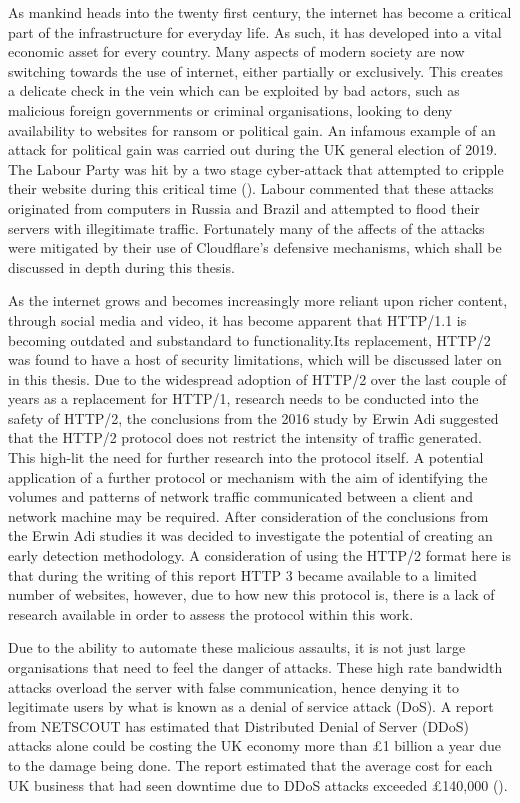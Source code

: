 
As mankind heads into the twenty first century, the internet has become a critical part of the infrastructure for everyday life. As such, it has developed into a vital economic asset for every country. Many aspects of modern society are now switching towards the use of internet, either partially or exclusively. This creates a delicate check in the vein which can be exploited by bad actors, such as malicious foreign governments or criminal organisations, looking to deny availability to websites for ransom or political gain. An infamous example of an attack for political gain was carried out during the UK general election of 2019. The Labour Party was hit by a two stage cyber-attack that attempted to cripple their website during this critical time (\cite{Labour}). Labour commented that these attacks originated from computers in Russia and Brazil and attempted to flood their servers with illegitimate traffic. Fortunately many of the affects of the attacks were mitigated by their use of Cloudflare's defensive mechanisms, which shall be discussed in depth during this thesis.


As the internet grows and becomes increasingly more reliant upon richer content, through social media and video, it has become apparent that HTTP/1.1 is becoming outdated and substandard to functionality.Its replacement, HTTP/2 was found to have a host of security limitations, which will be discussed later on in this thesis. Due to the widespread adoption of HTTP/2 over the last couple of years as a replacement for HTTP/1, research needs to be conducted into the safety of HTTP/2, the conclusions from the 2016 study by Erwin Adi suggested that the HTTP/2 protocol does not restrict the intensity of traffic generated. This high-lit the need for further research into the protocol itself. A potential application of a further protocol or mechanism with the aim of identifying the volumes and patterns of network traffic communicated between a client and network machine may be required. After consideration of the conclusions from the Erwin Adi studies it was decided to investigate the potential of creating an early detection methodology. A consideration of using the HTTP/2 format here is that during the writing of this report HTTP 3 became available to a limited number of websites, however, due to how new this protocol is, there is a lack of research available in order to assess the protocol within this work.


Due to the ability to automate these malicious assaults, it is not just large organisations that need to feel the danger of attacks. These high rate bandwidth attacks overload the server with false communication, hence denying it to legitimate users by what is known as a denial of service attack (DoS). A report from NETSCOUT has estimated that Distributed Denial of Server (DDoS) attacks alone could be costing the UK economy more than £1 billion a year due to the damage being done. The report estimated that the average cost for each UK business that had seen downtime due to DDoS attacks exceeded £140,000 (\cite{Costs}).

